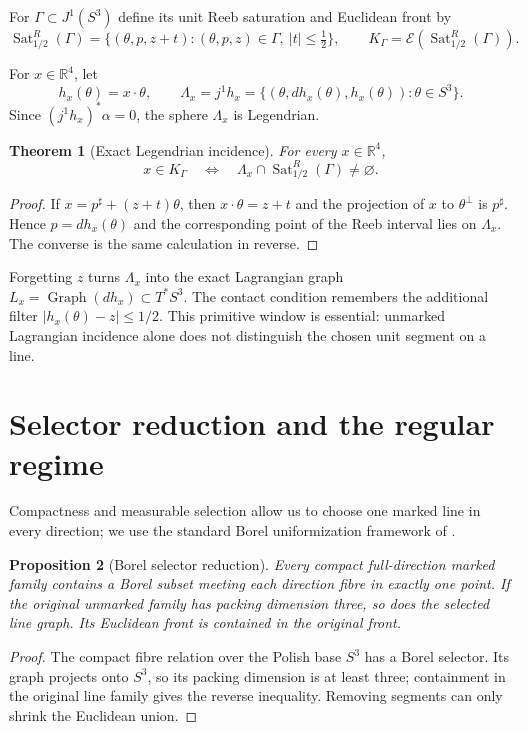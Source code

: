 \documentclass[10pt]{article}
\newtheorem{theorem}{Theorem}[section]
\newtheorem{proposition}[theorem]{Proposition}
\newcommand{\R}{\mathbb R}
\newcommand{\Sat}{\operatorname{Sat}}
\newcommand{\Graph}{\operatorname{Graph}}
\begin{document}
For $\Gamma\subset J^1(S^3)$ define its unit Reeb saturation and Euclidean front by
\[
 \Sat^R_{1/2}(\Gamma)
 =\{(\theta,p,z+t):(\theta,p,z)\in\Gamma,\ |t|\le\tfrac12\},
 \qquad
 K_\Gamma=\mathcal E(\Sat^R_{1/2}(\Gamma)).
\]

For $x\in\R^4$, let
\[
 h_x(\theta)=x\cdot\theta,
 \qquad
 \Lambda_x=j^1h_x
 =\{(\theta,dh_x(\theta),h_x(\theta)): \theta\in S^3\}.
\]
Since $(j^1h_x)^*\alpha=0$, the sphere $\Lambda_x$ is Legendrian.

\begin{theorem}[Exact Legendrian incidence]
\label{thm:legendrian-incidence}
For every $x\in\R^4$,
\[
 x\in K_\Gamma
 \quad\Longleftrightarrow\quad
 \Lambda_x\cap\Sat^R_{1/2}(\Gamma)\ne\varnothing.
\]
\end{theorem}

\begin{proof}
If $x=p^\sharp+(z+t)\theta$, then $x\cdot\theta=z+t$ and the projection of $x$ to
$\theta^\perp$ is $p^\sharp$. Hence $p=dh_x(\theta)$ and the corresponding point of the
Reeb interval lies on $\Lambda_x$. The converse is the same calculation in reverse.
\end{proof}

Forgetting $z$ turns $\Lambda_x$ into the exact Lagrangian graph
$L_x=\Graph(dh_x)\subset T^*S^3$. The contact condition remembers the additional filter
$|h_x(\theta)-z|\le1/2$. This primitive window is essential: unmarked Lagrangian incidence
alone does not distinguish the chosen unit segment on a line.

\section{Selector reduction and the regular regime}

Compactness and measurable selection allow us to choose one marked line in every direction;
we use the standard Borel uniformization framework of \cite{Kechris1995}.

\begin{proposition}[Borel selector reduction]
\label{prop:selector}
Every compact full-direction marked family contains a Borel subset meeting each direction fibre
in exactly one point. If the original unmarked family has packing dimension three, so does the
selected line graph. Its Euclidean front is contained in the original front.
\end{proposition}

\begin{proof}
The compact fibre relation over the Polish base $S^3$ has a Borel selector. Its graph projects
onto $S^3$, so its packing dimension is at least three; containment in the original line family
gives the reverse inequality. Removing segments can only shrink the Euclidean union.
\end{proof}
\end{document}
